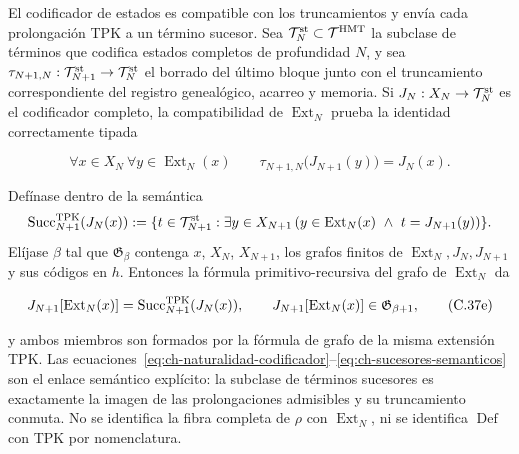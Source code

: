 El codificador de estados es compatible con los truncamientos y envía cada
prolongación TPK a un término sucesor. Sea
\(\mathcal T_N^{\rm st}\subset\mathcal T^{\rm HMT}\) la subclase de términos
que codifica estados completos de profundidad \(N\), y sea
\(\tau_{N+1,N}:\mathcal T_{N+1}^{\rm st}\to\mathcal T_N^{\rm st}\) el borrado
del último bloque junto con el truncamiento correspondiente del registro genealógico,
acarreo y memoria. Si \(J_N:X_N\to\mathcal T_N^{\rm st}\) es el codificador
completo, la compatibilidad de \(\operatorname{Ext}_N\) prueba la identidad
correctamente tipada

\[
 \forall x\in X_N\ \forall y\in\operatorname{Ext}_N(x)\qquad
 \tau_{N+1,N}\bigl(J_{N+1}(y)\bigr)=J_N(x).
\tag{C.37e$_0$}\label{eq:ch-naturalidad-codificador}
\]

Defínase dentro de la semántica
\[
 \operatorname{Succ}^{\rm TPK}_{N+1}(J_N(x)):=
 \{t\in\mathcal T_{N+1}^{\rm st}:\exists y\in X_{N+1}\,
   (y\in\operatorname{Ext}_N(x)\ \wedge\ t=J_{N+1}(y))\}.
\]
Elíjase \(\beta\) tal que \(\mathfrak G_\beta\) contenga \(x\), \(X_N\),
\(X_{N+1}\), los grafos finitos de
\(\operatorname{Ext}_N,J_N,J_{N+1}\) y sus códigos en \(h\). Entonces la
fórmula primitivo-recursiva del grafo de \(\operatorname{Ext}_N\) da

\[
 J_{N+1}[\operatorname{Ext}_N(x)]
 =\operatorname{Succ}^{\rm TPK}_{N+1}(J_N(x)),
 \qquad
 J_{N+1}[\operatorname{Ext}_N(x)]
 \in\mathfrak G_{\beta+1},
\tag{C.37e}\label{eq:ch-sucesores-semanticos}
\]

y ambos miembros son formados por la fórmula de grafo de la misma extensión
TPK. Las ecuaciones~\eqref{eq:ch-naturalidad-codificador}--\eqref{eq:ch-sucesores-semanticos} son el enlace semántico explícito: la
subclase de términos sucesores es exactamente la imagen de las prolongaciones
admisibles y su truncamiento conmuta. No se identifica la fibra completa de
\(\rho\) con \(\operatorname{Ext}_N\), ni se identifica
\(\operatorname{Def}\) con TPK por nomenclatura.

